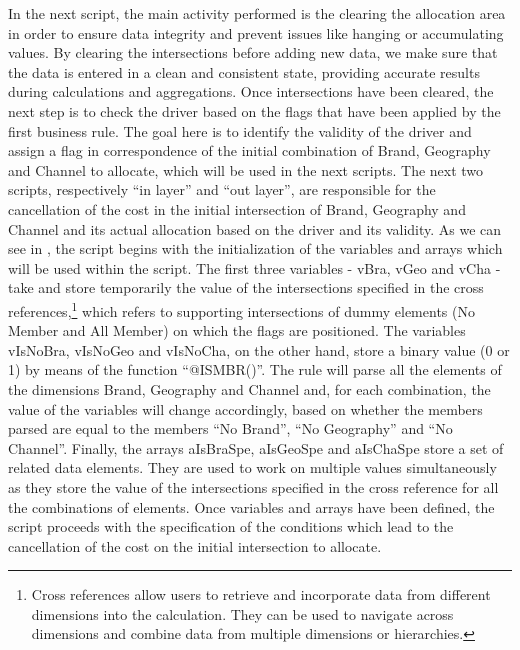 \documentclass[12pt,a4paper,openright,twoside]{book}
\begin{document}


In the next script, the main activity performed is the clearing the allocation area in order to ensure data integrity and prevent issues like hanging or accumulating values.
%
By clearing the intersections before adding new data, we make sure that the data is entered in a clean and consistent state, providing accurate results during calculations and aggregations.
%
Once intersections have been cleared, the next step is to check the driver based on the flags that have been applied by the first business rule.
%
The goal here is to identify the validity of the driver and assign a flag in correspondence of the initial combination of Brand, Geography and Channel to allocate, which will be used in the next scripts.
%
The next two scripts, respectively ``in layer'' and ``out layer'', are responsible for the cancellation of the cost in the initial intersection of Brand, Geography and Channel and its actual allocation based on the driver and its validity.
%
As we can see in , the script begins with the initialization of the variables and arrays which will be used within the script.
%
The first three variables - vBra, vGeo and vCha - take and store temporarily the value of the intersections specified in the cross references,\footnote{Cross references allow users to retrieve and incorporate data from different dimensions into the calculation. They can be used to navigate across dimensions and combine data from multiple dimensions or hierarchies.} which refers to supporting intersections of dummy elements (No Member and All Member) on which the flags are positioned.
%
The variables vIsNoBra, vIsNoGeo and vIsNoCha, on the other hand, store a binary value (0 or 1) by means of the function ``@ISMBR()''.
%
The rule will parse all the elements of the dimensions Brand, Geography and Channel and,  for each combination, the value of the variables will change accordingly, based on whether the members parsed are equal to the members ``No Brand'', ``No Geography'' and ``No Channel''.
%
Finally, the arrays aIsBraSpe, aIsGeoSpe and aIsChaSpe store a set of related data elements.
%
They are used to work on multiple values simultaneously as they store the value of the intersections specified in the cross reference for all the combinations of elements.
%
Once variables and arrays have been defined, the script proceeds with the specification of the conditions which lead to the cancellation of the cost on the initial intersection to allocate.
\end{document}
